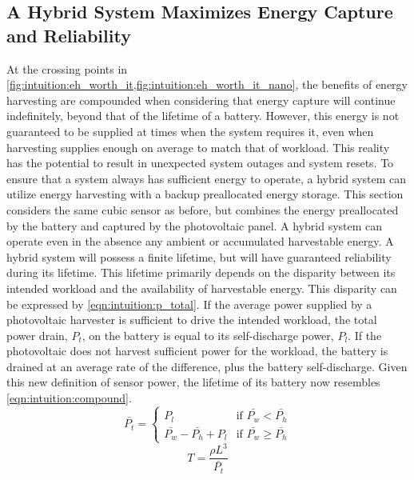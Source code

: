 
\subsection{A Hybrid System Maximizes Energy Capture and Reliability}
\label{sec:intuition:hybrid}
At the crossing points in \cref{fig:intuition:eh_worth_it,fig:intuition:eh_worth_it_nano}, the benefits of energy harvesting are compounded when considering that energy capture will continue indefinitely, beyond that of the lifetime of a battery.
However, this energy is not guaranteed to be supplied at times when the system requires it, even when harvesting supplies enough on average to match that of workload. This reality has the potential to result in unexpected system outages and system resets.
To ensure that a system always has sufficient energy to operate, a hybrid system can utilize energy harvesting with a backup preallocated energy storage.
This section considers the same cubic sensor as before, but combines the energy preallocated by the battery and captured by the photovoltaic panel. 
A hybrid system can operate even in the absence any ambient or accumulated harvestable energy. A hybrid system will possess a finite lifetime, but will have guaranteed reliability during its lifetime.
This lifetime primarily depends on the disparity between its intended workload and the availability of harvestable energy.
This disparity can be expressed by \cref{eqn:intuition:p_total}.
If the average power supplied by a photovoltaic harvester is sufficient to drive the intended workload, the total power drain, $P_t$, on the battery is equal to its self-discharge power, $P_l$.
If the photovoltaic does not harvest sufficient power for the workload, the battery is drained at an average rate of the difference, plus the battery self-discharge.
Given this new definition of sensor power, the lifetime of its battery now resembles \cref{eqn:intuition:compound}.
\begin{equation} \label{eqn:intuition:p_total}
    \bar{P_t} =
    \begin{cases}
        P_l & \text{if $\bar{P_w} < \bar{P_h}$} \\
        \bar{P_w} - \bar{P_h} + P_l & \text{if $\bar{P_w} \geq \bar{P_h}$}
    \end{cases}
\end{equation}
\begin{equation} \label{eqn:intuition:compound}
T = \frac{\rho L^3}{\bar{P_t}}
\end{equation}
